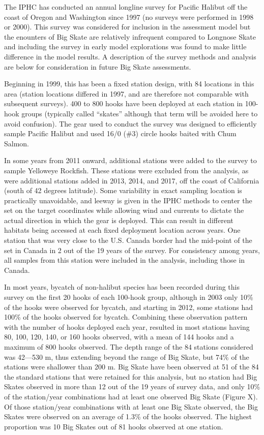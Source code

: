 \documentclass[12pt,]{article}
\begin{document}
The IPHC has conducted an annual longline survey for Pacific Halibut off
the coast of Oregon and Washington since 1997 (no surveys were performed
in 1998 or 2000). This survey was considered for inclusion in the
assessment model but the enounters of Big Skate are relatively
infrequent compared to Longnose Skate and including the survey in early
model explorations was found to make little difference in the model
results. A description of the survey methods and analysis are below for
consideration in future Big Skate assessments.

Beginning in 1999, this has been a fixed station design, with 84
locations in this area (station locations differed in 1997, and are
therefore not comparable with subsequent surveys). 400 to 800 hooks have
been deployed at each station in 100-hook groups (typically called
``skates'' although that term will be avoided here to avoid confusion).
The gear used to conduct the survey was designed to efficiently sample
Pacific Halibut and used 16/0 (\#3) circle hooks baited with Chum
Salmon.

In some years from 2011 onward, additional stations were added to the
survey to sample Yelloweye Rockfish. These stations were excluded from
the analysis, as were additional stations added in 2013, 2014, and 2017,
off the coast of California (south of 42 degrees latitude). Some
variability in exact sampling location is practically unavoidable, and
leeway is given in the IPHC methods to center the set on the target
coordinates while allowing wind and currents to dictate the actual
direction in which the gear is deployed. This can result in different
habitats being accessed at each fixed deployment location across years.
One station that was very close to the U.S. Canada border had the
mid-point of the set in Canada in 2 out of the 19 years of the survey.
For consistency among years, all samples from this station were included
in the analysis, including those in Canada.

In most years, bycatch of non-halibut species has been recorded during
this survey on the first 20 hooks of each 100-hook group, although in
2003 only 10\% of the hooks were observed for bycatch, and starting in
2012, some stations had 100\% of the hooks observed for bycatch.
Combining these observation pattern with the number of hooks deployed
each year, resulted in most stations having 80, 100, 120, 140, or 160
hooks observed, with a mean of 144 hooks and a maximum of 800 hooks
observed. The depth range of the 84 stations considered was 42---530 m,
thus extending beyond the range of Big Skate, but 74\% of the stations
were shallower than 200 m. Big Skate have been observed at 51 of the 84
the standard stations that were retained for this analysis, but no
station had Big Skates observed in more than 12 out of the 19 years of
survey data, and only 10\% of the station/year combinations had at least
one observed Big Skate (Figure X). Of those station/year combinations
with at least one Big Skate observed, the Big Skates were observed on an
average of 1.3\% of the hooks observed. The highest proportion was 10
Big Skates out of 81 hooks observed at one station.
\end{document}
